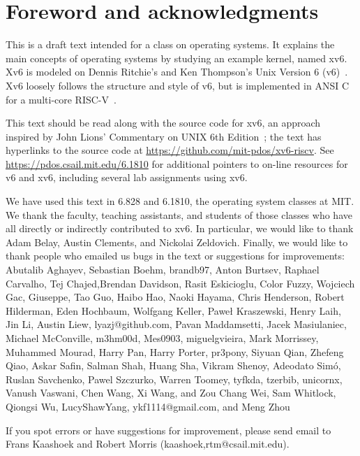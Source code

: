 \chapter*{Foreword and acknowledgments}


This is a draft text intended for a class on operating systems. It
explains the main concepts of operating systems by studying an example
kernel, named xv6.  Xv6 is modeled on Dennis Ritchie's and
Ken Thompson's Unix Version 6 (v6)~\cite{unix}.  Xv6 loosely follows the structure
and style of v6, but is implemented in ANSI C~\cite{kernighan} for 
a multi-core RISC-V~\cite{riscv}.

This text should be read along with the source code for xv6, an
approach inspired by John Lions' Commentary on UNIX 6th
Edition~\cite{lions}; the text has hyperlinks to the source code at
\url{https://github.com/mit-pdos/xv6-riscv}. See
\url{https://pdos.csail.mit.edu/6.1810} for additional pointers to
on-line resources for v6 and xv6, including several lab assignments
using xv6.

We have used this text in 6.828 and 6.1810, the operating system
classes at MIT.  We thank the faculty, teaching assistants, and
students of those classes who have all directly or indirectly
contributed to xv6.  In particular, we would like to thank Adam Belay,
Austin Clements, and Nickolai Zeldovich.  Finally, we would like to
thank people who emailed us bugs in the text or suggestions for
improvements: Abutalib Aghayev, Sebastian Boehm, brandb97, Anton
Burtsev, Raphael Carvalho, Tej Chajed,Brendan Davidson, Rasit
Eskicioglu, Color Fuzzy, Wojciech Gac, Giuseppe, Tao Guo, Haibo Hao,
Naoki Hayama, Chris Henderson, Robert Hilderman, Eden Hochbaum,
Wolfgang Keller, Paweł Kraszewski, Henry Laih, Jin Li, Austin Liew,
lyazj@github.com, Pavan Maddamsetti, Jacek Masiulaniec, Michael
McConville, m3hm00d, Mes0903, miguelgvieira, Mark Morrissey, Muhammed Mourad,
Harry Pan, Harry Porter, pr3pony, Siyuan Qian, Zhefeng Qiao, Askar Safin,
Salman Shah, Huang Sha, Vikram Shenoy, Adeodato Simó, Ruslan
Savchenko, Pawel Szczurko, Warren Toomey, tyfkda, tzerbib, unicornx, Vanush
Vaswani, Chen Wang, Xi Wang, and Zou Chang Wei, Sam Whitlock, Qiongsi Wu,
LucyShawYang, ykf1114@gmail.com, and Meng Zhou

If you spot errors or have suggestions for improvement, please send email to
Frans Kaashoek and Robert Morris (kaashoek,rtm@csail.mit.edu).
